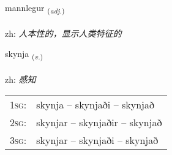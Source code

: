 \documentclass[frontgrid, backgrid]{flacards}\usepackage[]{graphicx}\usepackage[]{color}
\begin{document}
\renewcommand{\flhead}{\vskip5pt \fboxsep=0pt {\small\bfseries\footnotesize Lýsingarorð | 形容词}}
\renewcommand{\fcfoot}{\vskip5pt \fboxsep=0pt \hspace{2pt}{\small\bfseries\footnotesize 2K}}

\renewcommand{\blhead}{\vskip5pt {\small\bfseries\footnotesize Lýsingarorð | 形容词 }}
\renewcommand{\bcfoot}{\vskip5pt \hspace{2pt}{\small\bfseries\footnotesize 2K}}


{mannlegur \small{\textsubscript{(\textit{adj.})}} \\[1ex] %
\textphonetic{[manlɛɣʏr]} \\
zh: \emph{人本性的，显示人类特征的} \\  [2ex]
\renewcommand*{\arraystretch}{0.8}
}

\renewcommand{\flhead}{\vskip5pt \fboxsep=0pt {\small\bfseries\footnotesize Sagnorð | 动词}}
\renewcommand{\fcfoot}{\vskip5pt \fboxsep=0pt \hspace{2pt}{\small\bfseries\footnotesize 2K}}

\renewcommand{\blhead}{\vskip5pt {\small\bfseries\footnotesize Sagnorð | 动词 }}
\renewcommand{\bcfoot}{\vskip5pt \hspace{2pt}{\small\bfseries\footnotesize 2K}}


{skynja \small{\textsubscript{(\textit{v.})}} \\[1ex] %
\textphonetic{[scɪnja]} \\
zh: \emph{感知} \\  [2ex]
\renewcommand*{\arraystretch}{0.8}
\begin{tabular}{p{1cm}l}
\textsc{1sg}: & skynja -- skynjaði -- skynjað \\ 
\textsc{2sg}: & skynjar -- skynjaðir -- skynjað \\ 
\textsc{3sg}: & skynjar -- skynjaði -- skynjað \\ 
\end{tabular}
}
\end{document}

